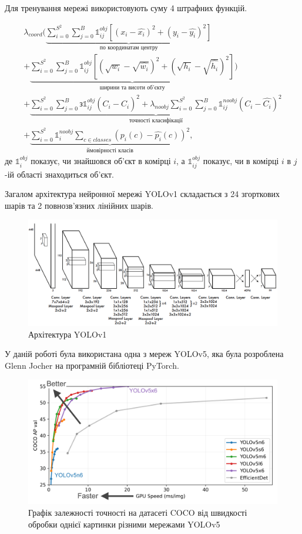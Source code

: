 Для тренування мережі використовують суму 4 штрафних функцій.

\begin{multline*}
    \lambda_{coord}(
    \underbrace{ \sum_{i=0}^{S^2} \sum_{j=0}^{B}
    \mathds{1}_{ij}^{obj} [(x_i - \widehat{x_i})^2 + (y_i - \widehat{y_i})^2]
    }_\textrm{по координатам центру}\\
    +
    \underbrace{
    \sum_{i=0}^{S^2} \sum_{j=0}^{B}
    \mathds{1}_{ij}^{obj} [(\sqrt{w_i} - \sqrt{\widehat{w_i}})^2 + (\sqrt{h_i} - \sqrt{\widehat{h_i}})^2]
    }_\textrm{ширини та висоти об'єкту}
    )\\
    +  \underbrace{
        \sum_{i=0}^{S^2} \sum_{j=0}^{B} з
        \mathds{1}_{ij}^{obj} (C_i - \widehat{C_i})^2
        +
        \lambda_{noobj} \sum_{i=0}^{S^2} \sum_{j=0}^{B} \mathds{1}_{ij}^{noobj} (C_i - \widehat{C_i})^2
    }_\textrm{точності класифікації}\\
    +  \underbrace{
    \sum_{i=0}^{S^2} \mathds{1}_{i}^{noobj}\sum_{c \in classes}(p_i(c) -  \widehat{p_i}(c))^2
    }_\textrm{ймовірності класів},
\end{multline*}
де $\mathds{1}_{i}^{obj}$ показує, чи знайшовся об'єкт в комірці $i$, а
$\mathds{1}_{ij}^{obj}$ показує, чи в комірці $i$ в $j$-ій області знаходиться об'єкт.

Загалом архітектура нейронної мережі YOLOv1 складається з 24 згорткових шарів та
2 повнозв'язних лінійних шарів.

\begin{figure}[H]
    \includegraphics[width=0.8\linewidth]{images/cnn_yolo2}
    \centering
    \caption{Архітектура YOLOv1 \cite{yolov1}
    }
\end{figure}

У даній роботі була використана одна з мереж YOLOv5, яка була
розроблена Glenn Jocher на програмній бібліотеці PyTorch.

\begin{figure}[H]
    \includegraphics[width=0.5\linewidth]{images/cnn_yolo3}
    \centering
    \caption{Графік залежності точності на датасеті COCO від швидкості обробки однієї
        картинки різними мережами YOLOv5
    }
\end{figure}

